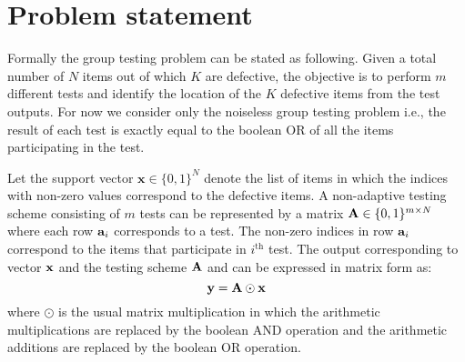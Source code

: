 
\section{Problem statement}
Formally the group testing problem can be stated as following. Given a total number of $N$ items out of which $K$ are defective, the objective is to perform $m$ different tests and identify the location of the $K$ defective items from the test outputs. For now we consider only the noiseless group testing problem i.e., the result of each test is exactly equal to the boolean OR of all the items participating in the test. 

Let the support vector $\mathbf{x}\in\{0,1\}^{N}$ denote the list of items in which the indices with non-zero values correspond to the defective items. A non-adaptive testing scheme consisting of $m$ tests can be represented by a matrix $\mathbf{A}\in\{0,1\}^{m\times N}$ where each row $\mathbf{a}_{i}$ corresponds to a test. The non-zero indices in row $\mathbf{a}_i$ correspond to the items that participate in $i^{\text{th}}$ test. The output corresponding to vector $\mathbf{x}$ and the testing scheme $\mathbf{A}$ and can be expressed in matrix form as:
\begin{equation*}
\mathbf{y}=\mathbf{A\odot x}
\end{equation*}
where $\odot$ is the usual matrix multiplication in which the arithmetic multiplications are replaced by the boolean AND operation and the arithmetic additions are replaced by the boolean OR operation.

